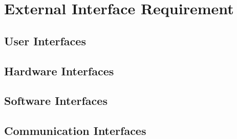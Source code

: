 \section{External Interface Requirement}
\subsection{User Interfaces}
\par
\par
\par
\par
\par
\subsection{Hardware Interfaces}
\subsection{Software Interfaces}
\subsection{Communication Interfaces}


